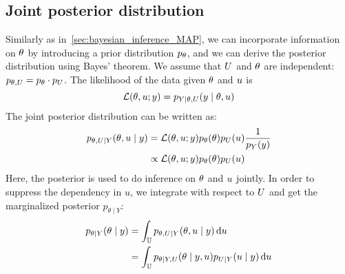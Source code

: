 \documentclass[../../Main_ManuscritThese.tex]{subfiles}
\begin{document}
\subsection{Joint posterior distribution}
Similarly as in~\cref{sec:bayesian_inference_MAP}, we can incorporate information on $\theta$ by introducing a prior distribution $p_{\theta}$, and we can derive the posterior distribution using Bayes' theorem. We assume that $U$ and $\theta$ are independent: $p_{\theta, U} = p_{\theta}\cdot p_{U}$.
The likelihood of the data given $\theta$ and $u$ is
\begin{equation}
  \mathcal{L}(\theta,u;y) = p_{Y \mid \theta, U}(y\mid \theta,u)
\end{equation}
The joint posterior distribution can be written as:
\begin{align}
  p_{\theta,U \mid Y}(\theta,u \mid y) &= \mathcal{L}(\theta,u;y)p_{\theta}(\theta)p_{U}(u) \frac{1}{p_Y(y)} \\
  &\propto \mathcal{L}(\theta,u;y)p_{\theta}(\theta)p_{U}(u)
\end{align}
Here, the posterior is used to do inference on $\theta$ and $u$ jointly. In order to suppress the dependency in $u$, we integrate with respect to $U$ and get the marginalized posterior $p_{\theta \mid Y}$:
\begin{align}
  p_{\theta \mid Y}(\theta \mid y) &= \int_{\mathbb{U}} p_{\theta,U\mid Y}(\theta,u\mid y)\,\mathrm{d}u \label{eq:marg_MMAP}\\
                             &= \int_{\mathbb{U}}p_{\theta \mid Y, U}(\theta \mid y, u) p_{U\mid Y}(u \mid y)\,\mathrm{d}u
\end{align}
\end{document}
